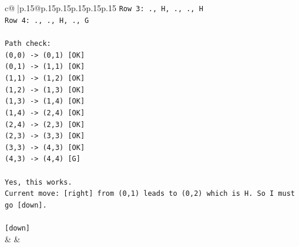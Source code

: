 \documentclass{article}
\begin{document}
{\begin{supertabular}{c@{$\;$}|p{.15\linewidth}@{}p{.15\linewidth}p{.15\linewidth}p{.15\linewidth}p{.15\linewidth}p{.15\linewidth}}
{{{\texttt{Row 3: ., H, ., ., H} \\
\texttt{Row 4: ., ., H, ., G} \\
\\ 
\texttt{Path check:} \\
\texttt{(0,0) {-}> (0,1) {[}OK{]}} \\
\texttt{(0,1) {-}> (1,1) {[}OK{]}} \\
\texttt{(1,1) {-}> (1,2) {[}OK{]}} \\
\texttt{(1,2) {-}> (1,3) {[}OK{]}} \\
\texttt{(1,3) {-}> (1,4) {[}OK{]}} \\
\texttt{(1,4) {-}> (2,4) {[}OK{]}} \\
\texttt{(2,4) {-}> (2,3) {[}OK{]}} \\
\texttt{(2,3) {-}> (3,3) {[}OK{]}} \\
\texttt{(3,3) {-}> (4,3) {[}OK{]}} \\
\texttt{(4,3) {-}> (4,4) {[}G{]}} \\
\\ 
\texttt{Yes, this works.} \\
\texttt{Current move: {[}right{]} from (0,1) leads to (0,2) which is H. So I must go {[}down{]}.} \\
\\ 
\texttt{{[}down{]}} \\
            }
        }
    }
    & & \\ \\


\end{supertabular}}
\end{document}
